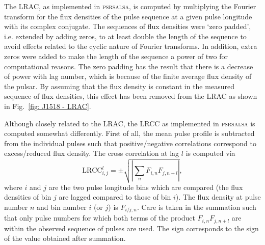 The LRAC, as implemented in \textsc{psrsalsa}, is computed by multiplying the Fourier transform for the flux densities of the pulse sequence at a given pulse longitude with its complex conjugate. The sequences of flux densities were `zero padded', i.e. extended by adding zeros, to at least double the length of the sequence to avoid effects related to the cyclic nature of Fourier transforms. In addition, extra zeros were added to make the length of the sequence a power of two for computational reasons. The zero padding has the result that there is a decrease of power with lag number, which is because of the finite average flux density of the pulsar. By assuming that the flux density is constant in the measured sequence of flux densities, this effect has been removed from the LRAC as shown in Fig.~\ref{fig: J1518 - LRAC}.

Although closely related to the LRAC, the LRCC as implemented in \textsc{psrsalsa} is computed somewhat differently. First of all, the mean pulse profile is subtracted from the individual pulses such that positive/negative correlations correspond to excess/reduced flux density. The cross correlation at lag $l$ is computed via
\begin{equation}
    \label{eq: J1518 - LRCC}
    \mathrm{LRCC}_{i,j}^l = \pm\sqrt{|\sum_nF_{i,n}F_{j,n+l}|},
\end{equation}
where $i$ and $j$ are the two pulse longitude bins which are compared (the flux densities of bin $j$ are lagged compared to those of bin $i$). The flux density at pulse number $n$ and bin number $i$ (or $j$) is $F_{i/j,n}$. Care is taken in the summation such that only pulse numbers for which both terms of the product $F_{i,n}F_{j,n+l}$ are within the observed sequence of pulses are used. The sign corresponds to the sign of the value obtained after summation.

